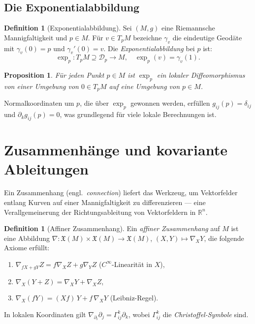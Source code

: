 \documentclass[12pt,a4paper]{amsart}
\newtheorem{proposition}[theorem]{Proposition}
\theoremstyle{definition}
\newtheorem{definition}[theorem]{Definition}
\begin{document}
\subsection{Die Exponentialabbildung}

\begin{definition}[Exponentialabbildung]
Sei $(M, g)$ eine Riemannsche Mannigfaltigkeit und $p \in M$. Für $v \in T_pM$
bezeichne $\gamma_v$ die eindeutige Geodäte mit $\gamma_v(0) = p$ und $\gamma_v'(0) = v$.
Die \emph{Exponentialabbildung} bei $p$ ist:
\[
  \exp_p: T_pM \supseteq \mathcal{D}_p \to M, \quad
  \exp_p(v) = \gamma_v(1).
\]
\end{definition}

\begin{proposition}
Für jeden Punkt $p \in M$ ist $\exp_p$ ein lokaler Diffeomorphismus von einer
Umgebung von $0 \in T_pM$ auf eine Umgebung von $p \in M$.
\end{proposition}

Normalkoordinaten um $p$, die über $\exp_p$ gewonnen werden, erfüllen
$g_{ij}(p) = \delta_{ij}$ und $\partial_k g_{ij}(p) = 0$, was grundlegend
für viele lokale Berechnungen ist.

\section{Zusammenhänge und kovariante Ableitungen}
\label{sec:zusammenhaenge}

Ein Zusammenhang (engl.\ \emph{connection}) liefert das Werkzeug, um Vektorfelder
entlang Kurven auf einer Mannigfaltigkeit zu differenzieren --- eine Verallgemeinerung
der Richtungsableitung von Vektorfeldern in $\mathbb{R}^n$.

\begin{definition}[Affiner Zusammenhang]
Ein \emph{affiner Zusammenhang} auf $M$ ist eine Abbildung
$\nabla: \mathfrak{X}(M) \times \mathfrak{X}(M) \to \mathfrak{X}(M)$,
$(X, Y) \mapsto \nabla_X Y$, die folgende Axiome erfüllt:
\begin{enumerate}[label=(\roman*)]
  \item $\nabla_{fX+gY} Z = f \nabla_X Z + g \nabla_Y Z$ \quad ($C^\infty$-Linearität in $X$),
  \item $\nabla_X(Y + Z) = \nabla_X Y + \nabla_X Z$,
  \item $\nabla_X(fY) = (Xf)\,Y + f\,\nabla_X Y$ (Leibniz-Regel).
\end{enumerate}
In lokalen Koordinaten gilt $\nabla_{\partial_i} \partial_j = \Gamma^k_{ij} \partial_k$,
wobei $\Gamma^k_{ij}$ die \emph{Christoffel-Symbole} sind.
\end{definition}
\end{document}
